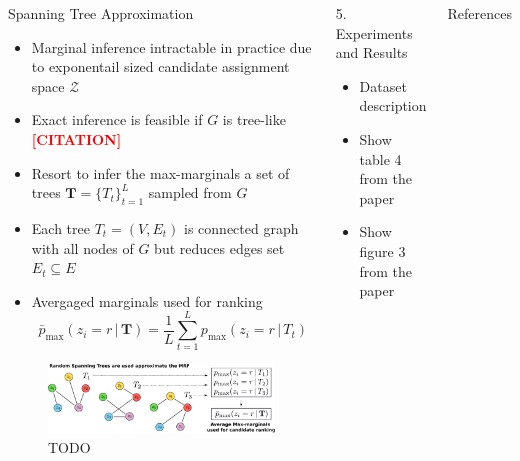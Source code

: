 \documentclass{beamer}
\newcommand{\todocite}{\textcolor{red}{\textbf{[CITATION]}}}
\begin{document}
\begin{frame}{}
\begin{columns}[T]
    \begin{block}{{\normalsize Spanning Tree Approximation}}
    \begin{itemize}
        \item Marginal inference intractable in practice due to exponentail sized candidate assignment space $\mathcal{Z}$
        \item Exact inference is feasible if $G$ is tree-like \todocite
        \item Resort to infer the max-marginals a set of trees $\mathbf{T}=\{T_t\}_{t=1}^L$ sampled from $G$
        \item Each tree $T_t=(V,E_t)$ is connected graph with all nodes of $G$ but reduces edges set $E_t\subseteq E$
        \item Avergaged marginals used for ranking
            \begin{equation}
                \bar{p}_{\max}(z_i=r\,|\,\mathbf{T})=\frac{1}{L}\sum_{t=1}^L p_{\max}(z_i=r\,|\,T_t)
            \end{equation}
    \end{itemize}
    \begin{figure}
        \centering
        \includegraphics[width=\textwidth]{images/random_spanning_trees.pdf}
        \caption{TODO}
    \end{figure}
    \end{block}


    \begin{block}{{\normalsize 5. Experiments and Results}}
    \begin{itemize}
        \item Dataset description
        \item Show table 4 from the paper
        \item Show figure 3 from the paper
    \end{itemize}
    \end{block}



\vfill

\begin{block}{\small References}
    
    \vspace{-1cm}
    \begin{multicols}{2}
        \begin{footnotesize}
            
        \end{footnotesize}
    \end{multicols} 
\end{block}

\end{columns}

\vfill

\end{frame}
\end{document}

